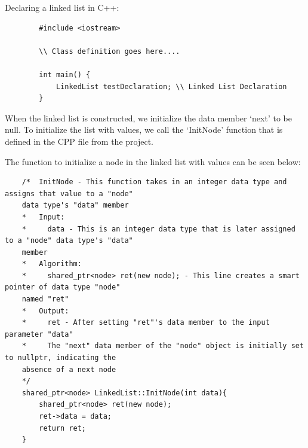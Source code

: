 \documentclass[a4paper,9pt]{article}
\begin{document}
\begin{highlight}
    Declaring a linked list in C++:

    \horizontalline

    \begin{verbatim}
        #include <iostream>

        \\ Class definition goes here....

        int main() {
            LinkedList testDeclaration; \\ Linked List Declaration
        }
    \end{verbatim}

    \horizontalline
\end{highlight}

When the linked list is constructed, we initialize the data member `next' to be null. To initialize the list with values, we call
the `InitNode' function that is defined in the CPP file from the project.

\begin{highlight}
    The function to initialize a node in the linked list with values can be seen below:

    \horizontalline

    \begin{verbatim}
    /*  InitNode - This function takes in an integer data type and assigns that value to a "node" 
    data type's "data" member
    *   Input:
    *     data - This is an integer data type that is later assigned to a "node" data type's "data" 
    member
    *   Algorithm:
    *     shared_ptr<node> ret(new node); - This line creates a smart pointer of data type "node" 
    named "ret"
    *   Output:
    *     ret - After setting "ret"'s data member to the input parameter "data"
    *     The "next" data member of the "node" object is initially set to nullptr, indicating the 
    absence of a next node
    */
    shared_ptr<node> LinkedList::InitNode(int data){
        shared_ptr<node> ret(new node);
        ret->data = data;
        return ret;
    }
    \end{verbatim}

    \horizontalline
\end{highlight}
\end{document}
